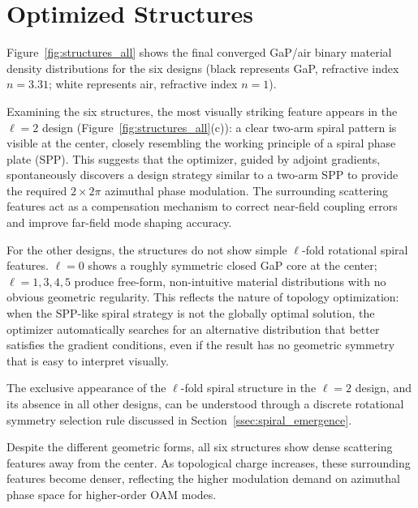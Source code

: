 
\section{Optimized Structures}

\label{sec:structures}


Figure~\ref{fig:structures_all} shows the final converged GaP/air binary material density distributions for the six designs (black represents GaP, refractive index $n = 3.31$; white represents air, refractive index $n = 1$).

Examining the six structures, the most visually striking feature appears in the $\ell = 2$ design (Figure~\ref{fig:structures_all}(c)): a clear two-arm spiral pattern is visible at the center, closely resembling the working principle of a spiral phase plate (SPP). This suggests that the optimizer, guided by adjoint gradients, spontaneously discovers a design strategy similar to a two-arm SPP to provide the required $2 \times 2\pi$ azimuthal phase modulation. The surrounding scattering features act as a compensation mechanism to correct near-field coupling errors and improve far-field mode shaping accuracy.

For the other designs, the structures do not show simple $\ell$-fold rotational spiral features. $\ell = 0$ shows a roughly symmetric closed GaP core at the center; $\ell = 1, 3, 4, 5$ produce free-form, non-intuitive material distributions with no obvious geometric regularity. This reflects the nature of topology optimization: when the SPP-like spiral strategy is not the globally optimal solution, the optimizer automatically searches for an alternative distribution that better satisfies the gradient conditions, even if the result has no geometric symmetry that is easy to interpret visually.

The exclusive appearance of the $\ell$-fold spiral structure in the $\ell = 2$ design, and its absence in all other designs, can be understood through a discrete rotational symmetry selection rule discussed in Section~\ref{ssec:spiral_emergence}.

Despite the different geometric forms, all six structures show dense scattering features away from the center. As topological charge increases, these surrounding features become denser, reflecting the higher modulation demand on azimuthal phase space for higher-order OAM modes.


